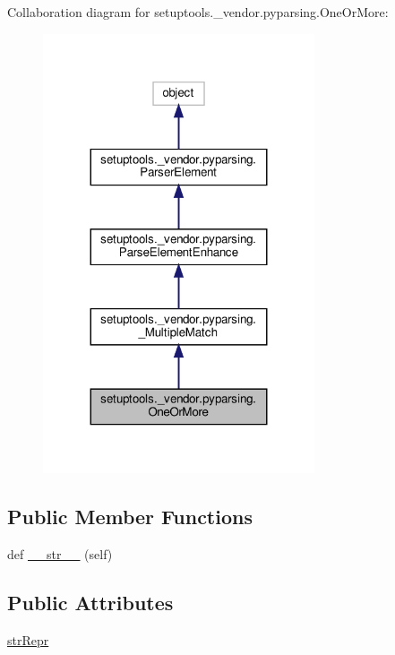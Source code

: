 Collaboration diagram for setuptools.\+\_\+vendor.\+pyparsing.\+One\+Or\+More\+:
\nopagebreak
\begin{figure}[H]
\begin{center}
\leavevmode
\includegraphics[width=227pt]{classsetuptools_1_1__vendor_1_1pyparsing_1_1OneOrMore__coll__graph}
\end{center}
\end{figure}
\subsection*{Public Member Functions}
\begin{DoxyCompactItemize}
\item 
def \hyperlink{classsetuptools_1_1__vendor_1_1pyparsing_1_1OneOrMore_a0ae3a5700eda959018801f21bc695aa2}{\+\_\+\+\_\+str\+\_\+\+\_\+} (self)
\end{DoxyCompactItemize}
\subsection*{Public Attributes}
\begin{DoxyCompactItemize}
\item 
\hyperlink{classsetuptools_1_1__vendor_1_1pyparsing_1_1OneOrMore_a883dd01ccfe60d6fdab612eeb2e3eb9c}{str\+Repr}
\end{DoxyCompactItemize}
